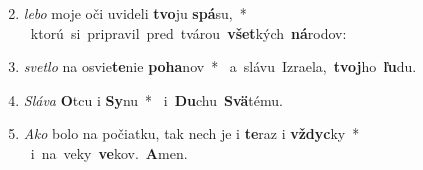 \begin{flushleft}
\begin{enumerate}[leftmargin=*]
\setcounter{enumi}{1}
\item \textit{lebo} moje oči uvideli \textbf{tvo}ju \textbf{spá}su,~* \mbox{ ktorú si pripravil pred tvárou \textbf{všet}kých \textbf{ná}rodov:}
\item \textit{svetlo} na osvie\textbf{te}nie \textbf{poha}nov~* \mbox{ a slávu Izraela, \textbf{tvoj}ho \textbf{ľu}du.}
\item \textit{Sláva} \textbf{O}tcu i \textbf{Sy}nu~* \mbox{ i \textbf{Du}chu \textbf{Svä}tému.}
\item \textit{Ako} bolo na počiatku, tak nech je i \textbf{te}raz i \textbf{vždyc}ky~* \mbox{ i na veky \textbf{ve}kov. \textbf{A}men.}
\end{enumerate}
\end{flushleft}
